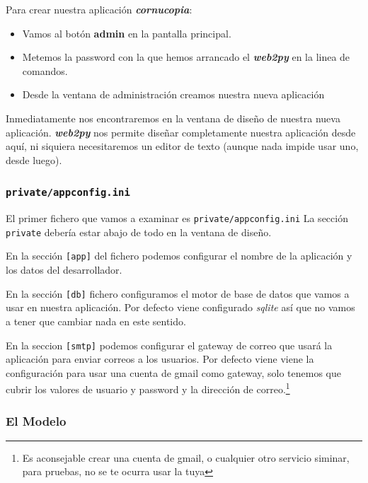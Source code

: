 \documentclass[
  12pt,
  spanish,
]{article}
\providecommand{\tightlist}{%
  \setlength{\itemsep}{0pt}\setlength{\parskip}{0pt}}
\begin{document}
Para crear nuestra aplicación \textbf{\emph{cornucopia}}:

\begin{itemize}
\tightlist
\item
  Vamos al botón \textbf{admin} en la pantalla principal.
\item
  Metemos la password con la que hemos arrancado el
  \textbf{\emph{web2py}} en la linea de comandos.
\item
  Desde la ventana de administración creamos nuestra nueva aplicación
\end{itemize}

Inmediatamente nos encontraremos en la ventana de diseño de nuestra
nueva aplicación. \textbf{\emph{web2py}} nos permite diseñar
completamente nuestra aplicación desde aquí, ni siquiera necesitaremos
un editor de texto (aunque nada impide usar uno, desde luego).

\hypertarget{privateappconfig.ini}{%
\subsubsection{\texorpdfstring{\texttt{private/appconfig.ini}}{private/appconfig.ini}}\label{privateappconfig.ini}}

El primer fichero que vamos a examinar es \texttt{private/appconfig.ini}
La sección \texttt{private} debería estar abajo de todo en la ventana de
diseño.

En la sección \texttt{{[}app{]}} del fichero podemos configurar el
nombre de la aplicación y los datos del desarrollador.

En la sección \texttt{{[}db{]}} fichero configuramos el motor de base de
datos que vamos a usar en nuestra aplicación. Por defecto viene
configurado \emph{sqlite} así que no vamos a tener que cambiar nada en
este sentido.

En la seccion \texttt{{[}smtp{]}} podemos configurar el gateway de
correo que usará la aplicación para enviar correos a los usuarios. Por
defecto viene viene la configuración para usar una cuenta de gmail como
gateway, solo tenemos que cubrir los valores de usuario y password y la
dirección de correo.\footnote{Es aconsejable crear una cuenta de gmail,
  o cualquier otro servicio siminar, para pruebas, no se te ocurra usar
  la tuya}

\hypertarget{el-modelo}{%
\subsubsection{El Modelo}\label{el-modelo}}
\end{document}
